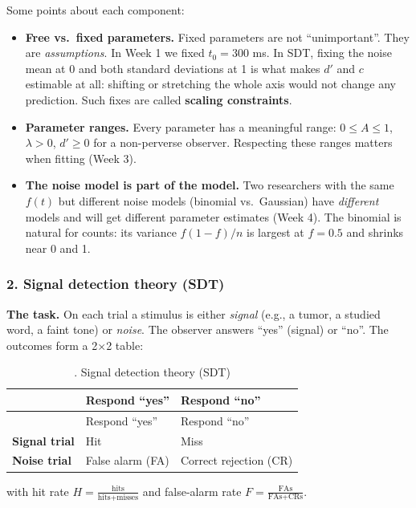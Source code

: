 Some points about each component:

\begin{itemize}
\tightlist
\item
  \textbf{Free vs.~fixed parameters.} Fixed parameters are not
  ``unimportant''. They are \emph{assumptions}. In Week 1 we fixed
  \(t_0 = 300\) ms. In SDT, fixing the noise mean at 0 and both standard
  deviations at 1 is what makes \(d'\) and \(c\) estimable at all:
  shifting or stretching the whole axis would not change any prediction.
  Such fixes are called \textbf{scaling constraints}.
\item
  \textbf{Parameter ranges.} Every parameter has a meaningful range:
  \(0 \le A \le 1\), \(\lambda > 0\), \(d' \ge 0\) for a non-perverse
  observer. Respecting these ranges matters when fitting (Week 3).
\item
  \textbf{The noise model is part of the model.} Two researchers with
  the same \(f(t)\) but different noise models (binomial vs.~Gaussian)
  have \emph{different} models and will get different parameter
  estimates (Week 4). The binomial is natural for counts: its variance
  \(f(1-f)/n\) is largest at \(f = 0.5\) and shrinks near 0 and 1.
\end{itemize}

\subsubsection{2. Signal detection theory (SDT)}

\textbf{The task.} On each trial a stimulus is either \emph{signal}
(e.g., a tumor, a studied word, a faint tone) or \emph{noise}. The
observer answers ``yes'' (signal) or ``no''. The outcomes form a 2×2
table:

\begin{longtable}[]{@{}lll@{}}
\caption{. Signal detection theory (SDT)}\tabularnewline
\toprule\noalign{}
& Respond ``yes'' & Respond ``no'' \\
\midrule\noalign{}
\endfirsthead
\toprule\noalign{}
& Respond ``yes'' & Respond ``no'' \\
\midrule\noalign{}
\endhead
\bottomrule\noalign{}
\endlastfoot
\textbf{Signal trial} & Hit & Miss \\
\textbf{Noise trial} & False alarm (FA) & Correct rejection (CR) \\
\end{longtable}

with hit rate \(H = \frac{\text{hits}}{\text{hits} + \text{misses}}\)
and false-alarm rate \(F = \frac{\text{FAs}}{\text{FAs} + \text{CRs}}\).

